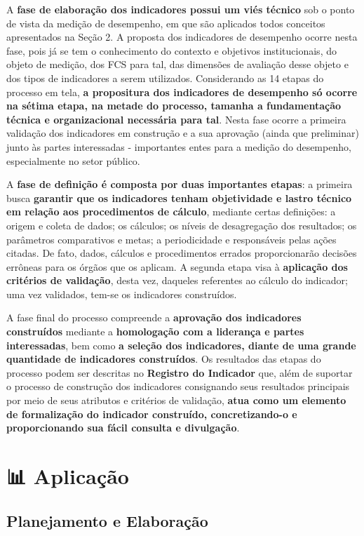 \documentclass[
  letterpaper,
  DIV=11,
  numbers=noendperiod]{scrreprt}
\begin{document}
A \textbf{fase de elaboração dos indicadores possui um viés técnico} sob
o ponto de vista da medição de desempenho, em que são aplicados todos
conceitos apresentados na Seção 2. A proposta dos indicadores de
desempenho ocorre nesta fase, pois já se tem o conhecimento do contexto
e objetivos institucionais, do objeto de medição, dos FCS para tal, das
dimensões de avaliação desse objeto e dos tipos de indicadores a serem
utilizados. Considerando as 14 etapas do processo em tela, \textbf{a
propositura dos indicadores de desempenho só ocorre na sétima etapa, na
metade do processo, tamanha a fundamentação técnica e organizacional
necessária para tal}. Nesta fase ocorre a primeira validação dos
indicadores em construção e a sua aprovação (ainda que preliminar) junto
às partes interessadas - importantes entes para a medição do desempenho,
especialmente no setor público.

A \textbf{fase de definição é composta por duas importantes etapas}: a
primeira busca \textbf{garantir que os indicadores tenham objetividade e
lastro técnico em relação aos procedimentos de cálculo}, mediante certas
definições: a origem e coleta de dados; os cálculos; os níveis de
desagregação dos resultados; os parâmetros comparativos e metas; a
periodicidade e responsáveis pelas ações citadas. De fato, dados,
cálculos e procedimentos errados proporcionarão decisões errôneas para
os órgãos que os aplicam. A segunda etapa visa à \textbf{aplicação dos
critérios de validação}, desta vez, daqueles referentes ao cálculo do
indicador; uma vez validados, tem-se os indicadores construídos.

A fase final do processo compreende a \textbf{aprovação dos indicadores
construídos} mediante a \textbf{homologação com a liderança e partes
interessadas}, bem como \textbf{a seleção dos indicadores, diante de uma
grande quantidade de indicadores construídos}. Os resultados das etapas
do processo podem ser descritas no \textbf{Registro do Indicador} que,
além de suportar o processo de construção dos indicadores consignando
seus resultados principais por meio de seus atributos e critérios de
validação, \textbf{atua como um elemento de formalização do indicador
construído, concretizando-o e proporcionando sua fácil consulta e
divulgação}.

\part{📊 Aplicação}

\hypertarget{planejamento-e-elaborauxe7uxe3o}{%
\chapter*{Planejamento e
Elaboração}\label{planejamento-e-elaborauxe7uxe3o}}
\end{document}
